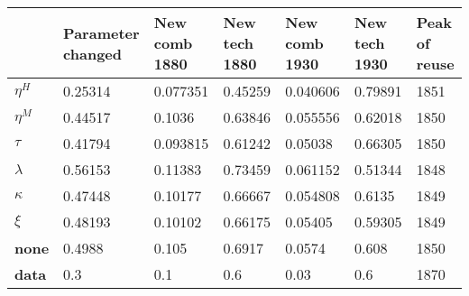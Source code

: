 \begin{tabular}{|l|l|l|l|l|l|l|}
\hline
&\textbf{Parameter changed}&\textbf{New comb 1880}&\textbf{New tech 1880}&\textbf{New comb 1930}&\textbf{New tech 1930}&\textbf{Peak of reuse}\\\hline
\textbf{$\eta^H$}&0.25314&0.077351&0.45259&0.040606&0.79891&1851\\\hline
\textbf{$\eta^M$}&0.44517&0.1036&0.63846&0.055556&0.62018&1850\\\hline
\textbf{$\tau$}&0.41794&0.093815&0.61242&0.05038&0.66305&1850\\\hline
\textbf{$\lambda$}&0.56153&0.11383&0.73459&0.061152&0.51344&1848\\\hline
\textbf{$\kappa$}&0.47448&0.10177&0.66667&0.054808&0.6135&1849\\\hline
\textbf{$\xi$}&0.48193&0.10102&0.66175&0.05405&0.59305&1849\\\hline
\textbf{none}&0.4988&0.105&0.6917&0.0574&0.608&1850\\\hline
\textbf{data}&0.3&0.1&0.6&0.03&0.6&1870\\\hline
\end{tabular}
